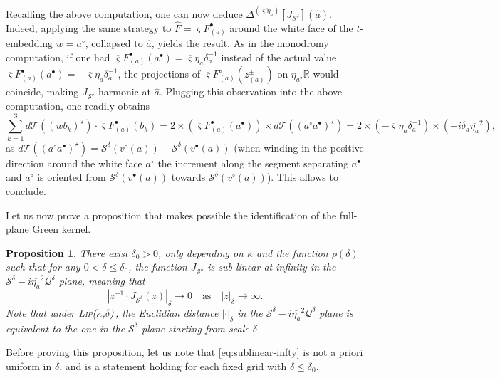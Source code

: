 \documentclass[reqno]{amsart}
\numberwithin{equation}{section}
\newtheorem{prop}[theo]{Proposition}
\theoremstyle{definition}
\theoremstyle{remark}
\newcommand\cS{\mathcal{S}}
\newcommand\cT{\mathcal{T}}
\def\LipKd{{\mbox{\textsc{Lip(}$\kappa$\textsc{,}$\delta$\textsc{)}}}}
\begin{document}
 Recalling the above computation, one can now deduce $\Delta^{(\overline{\varsigma \eta_a})}[J_{\cS^\delta}](\hat{a})$. Indeed, applying the same strategy to $\widehat{F}=\overline{\varsigma}F_{(a)}^\bullet$ around the white face of the $t$-embedding $w=a^\circ$, collapsed to $\hat{a}$, yields the result. As in the monodromy computation, if one had $\overline{\varsigma}F_{(a)}^\bullet(a^\bullet)=\overline{\varsigma}\eta_a\delta_a^{-1}$ instead of the actual value $\overline{\varsigma}F_{(a)}^\bullet(a^\bullet)=-\overline{\varsigma}\eta_a\delta_a^{-1}$, the projections of $\overline{\varsigma}F_{(a)}^\circ(z_{(a)}^\pm)$ on $\eta_{a^\bullet}\mathbb{R}$ would coincide, making $J_{\cS^\delta}$ harmonic at $\hat{a}$. Plugging this observation into the above computation, one readily obtains
 \begin{equation}
 	\sum_{k=1}^{3} d\cT((wb_k)^\star)\cdot  \overline{\varsigma}F_{(a)}^\bullet(b_k)= 2\times (  \overline{\varsigma} F_{(a)}^\bullet(a^\bullet)) \times d\cT((a^\circ a^\bullet) ^\star) =2 \times (-\overline{\varsigma}\eta_a\delta_a^{-1})\times (- i\delta_a \overline{\eta_a}^2), 
 \end{equation}
as $d\cT((a^\circ a^\bullet) ^\star)= \mathcal{S}^\delta(v^{\circ}(a))-\mathcal{S}^\delta(v^{\bullet}(a))$ (when winding in the positive direction around the white face $a^\circ$ the increment along the segment separating $a^\bullet$ and $a^\circ$ is oriented from $\mathcal{S}^\delta(v^{\bullet}(a)) $ towards $\mathcal{S}^\delta(v^{\circ}(a))$). This allows to conclude.
\medskip

Let us now prove a proposition that makes possible the identification of the full-plane Green kernel.

\begin{prop}\label{prop:full-plane-kernel-identification}
	There exist $\delta_0 >0$, only depending on $\kappa $ and the function $\rho(\delta)$ such that for any $0<\delta \leq \delta_0 $, the function $J_{\cS^\delta}$ is sub-linear at infinity in the
    $\cS^\delta - i\overline{\eta_a}^2 \mathcal{Q}^\delta$ plane, meaning that
\begin{equation}\label{eq:sublinear-infty}
	    |z^{-1} \cdot J_{\cS^\delta}(z)|_{\delta} \to 0
       \quad \text{as} \quad |z|_\delta \to \infty.
\end{equation}
Note that under \LipKd\,, the Euclidian distance $|\cdot|_{\delta}$ in the $\cS^\delta - i\overline{\eta_a}^2 \mathcal{Q}^\delta$ plane is equivalent to the one in the $\cS^\delta$ plane starting from scale $ \delta$.
\end{prop}
Before proving this proposition, let us note that \eqref{eq:sublinear-infty} is not a priori uniform in $\delta$, and is a statement holding for each fixed grid with $\delta \leq \delta_0$.
\end{document}
